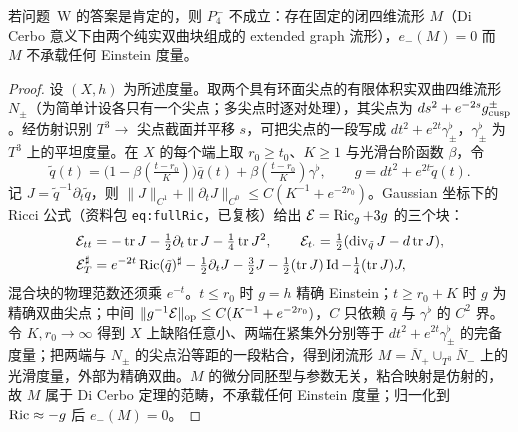 \begin{theorem}[条件定理]\label{thm:W}
若问题~W 的答案是肯定的，则 $P_4^-$ 不成立：存在固定的闭四维流形 $M$（Di Cerbo 意义下由两个纯实双曲块组成的 extended graph 流形），$e_-(M)=0$ 而 $M$ 不承载任何 Einstein 度量。
\end{theorem}
\begin{proof}
设 $(X,h)$ 为所述度量。取两个具有环面尖点的有限体积实双曲四维流形 $N_\pm$（为简单计设各只有一个尖点；多尖点时逐对处理），其尖点为 $ds^2+e^{-2s}g^\pm_{\rm cusp}$。经仿射识别 $T^3\to$ 尖点截面并平移 $s$，可把尖点的一段写成 $dt^2+e^{2t}\gamma^\flat_\pm$，$\gamma^\flat_\pm$ 为 $T^3$ 上的平坦度量。在 $X$ 的每个端上取 $r_0\ge t_0$、$K\ge1$ 与光滑台阶函数 $\beta$，令
\[
\tilde q(t)=\bigl(1-\beta(\tfrac{t-r_0}{K})\bigr)\bar q(t)+\beta(\tfrac{t-r_0}{K})\gamma^\flat,\qquad g=dt^2+e^{2t}\tilde q(t).
\]
记 $J=\tilde q^{-1}\partial_t\tilde q$，则 $\|J\|_{C^1}+\|\partial_tJ\|_{C^0}\le C(K^{-1}+e^{-2r_0})$。Gaussian 坐标下的 Ricci 公式（资料包 \texttt{eq:fullRic}，已复核）给出 $\mathcal E=\operatorname{Ric}_g+3g$ 的三个块：
\begin{align*}
\mathcal E_{tt}&=-\operatorname{tr} J-\tfrac12\partial_t\operatorname{tr} J-\tfrac14\operatorname{tr} J^2,\qquad
\mathcal E_{t\cdot}=\tfrac12(\operatorname{div}_{\tilde q}J-d\operatorname{tr} J),\\
\mathcal E_T^\sharp&=e^{-2t}\operatorname{Ric}(\tilde q)^\sharp-\tfrac12\partial_tJ-\tfrac32J-\tfrac12(\operatorname{tr} J)\operatorname{Id}-\tfrac14(\operatorname{tr} J)J,
\end{align*}
混合块的物理范数还须乘 $e^{-t}$。$t\le r_0$ 时 $g=h$ 精确 Einstein；$t\ge r_0+K$ 时 $g$ 为精确双曲尖点；中间 $\|g^{-1}\mathcal E\|_{\mathrm{op}}\le C(K^{-1}+e^{-2r_0})$，$C$ 只依赖 $\bar q$ 与 $\gamma^\flat$ 的 $C^2$ 界。令 $K,r_0\to\infty$ 得到 $X$ 上缺陷任意小、两端在紧集外分别等于 $dt^2+e^{2t}\gamma^\flat_\pm$ 的完备度量；把两端与 $N_\pm$ 的尖点沿等距的一段粘合，得到闭流形 $M=\overline N_+\cup_{T^3}\overline N_-$ 上的光滑度量，外部为精确双曲。$M$ 的微分同胚型与参数无关，粘合映射是仿射的，故 $M$ 属于 Di Cerbo 定理的范畴，不承载任何 Einstein 度量；归一化到 $\operatorname{Ric}\approx-g$ 后 $e_-(M)=0$。
\end{proof}

